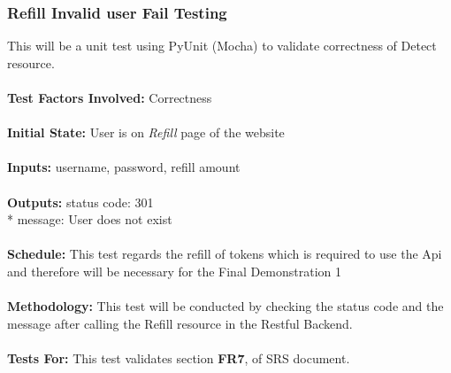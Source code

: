 \documentclass[12pt, titlepage]{article}
\begin{document}
\subsubsection{{Refill Invalid user Fail Testing}}
This will be a unit test using PyUnit (Mocha) to validate correctness of Detect resource. \\
\\
\textbf{Test Factors Involved:} Correctness \\
\\
\textbf{Initial State: } User is on \textit{Refill} page of the website \\
\\
\textbf{Inputs: } username, password, refill amount \\
\\
\textbf{Outputs:} status code: 301 \\*
                  message: User does not exist \\
\\
\textbf{Schedule:} This test regards the refill of tokens which is required to use the Api and therefore will be necessary for the Final Demonstration 1 \\
\\
\textbf{Methodology: } This test will be conducted by checking the status code and the message after calling the Refill resource in the Restful Backend. \\
\\
\textbf{Tests For:} This test validates section \textbf{FR7}, of SRS document.

\end{document}
